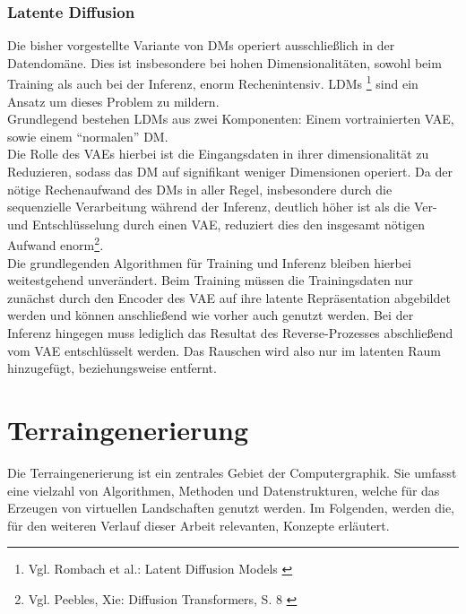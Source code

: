 \subsubsection{Latente Diffusion}

Die bisher vorgestellte Variante von \ac{DM}s operiert ausschließlich in der Datendomäne. Dies ist insbesondere bei hohen Dimensionalitäten, sowohl beim Training als auch bei der Inferenz, enorm Rechenintensiv. \ac{LDM}s \footnote{
    Vgl. Rombach et al.: Latent Diffusion Models
    \cite{rombach2022high}
} sind ein Ansatz um dieses Problem zu mildern. \\
Grundlegend bestehen \ac{LDM}s aus zwei Komponenten: Einem vortrainierten \ac{VAE}, sowie einem \enquote{normalen} \ac{DM}. \\
Die Rolle des \ac{VAE}s hierbei ist die Eingangsdaten in ihrer dimensionalität zu Reduzieren, sodass das \ac{DM} auf signifikant weniger Dimensionen operiert. Da der nötige Rechenaufwand des \ac{DM}s in aller Regel, insbesondere durch die sequenzielle Verarbeitung während der Inferenz, deutlich höher ist als die Ver- und Entschlüsselung durch einen VAE, reduziert dies den insgesamt nötigen Aufwand enorm\footnote{
    Vgl. Peebles, Xie: Diffusion Transformers, S. 8
    \cite{peebles2023scalable}
}. \\
Die grundlegenden Algorithmen für Training und Inferenz bleiben hierbei weitestgehend unverändert. Beim Training müssen die Trainingsdaten nur zunächst durch den Encoder des \ac{VAE} auf ihre latente Repräsentation abgebildet werden und können anschließend wie vorher auch genutzt werden. Bei der Inferenz hingegen muss lediglich das Resultat des Reverse-Prozesses abschließend vom \ac{VAE} entschlüsselt werden. Das Rauschen wird also nur im latenten Raum hinzugefügt, beziehungsweise entfernt.


\section{Terraingenerierung}

Die Terraingenerierung ist ein zentrales Gebiet der Computergraphik. Sie umfasst eine vielzahl von Algorithmen, Methoden und Datenstrukturen, welche für das Erzeugen von virtuellen Landschaften genutzt werden. Im Folgenden, werden die, für den weiteren Verlauf dieser Arbeit relevanten, Konzepte erläutert.

